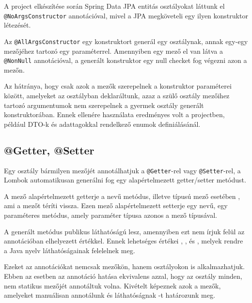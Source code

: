 A project elkészítése során Spring Data JPA entitás osztályokat láttunk el \lstinline|@NoArgsConstructor| annotációval, mivel a JPA megköveteli egy ilyen konstruktor létezését. \par


Az \lstinline|@AllArgsConstructor| egy konstruktort generál egy osztálynak, annak egy-egy mezőjéhez tartozó egy paraméterrel. Amennyiben egy mező el van látva a \lstinline|@NonNull| annotációval, a generált konstruktor egy null checket fog végezni azon a mezőn.


Az  hátránya, hogy csak azok a mezők szerepelnek a konstruktor paraméterei között, amelyeket az osztályban deklaráltunk, azaz a szülő osztály mezőihez tartozó argumentumok nem szerepelnek a gyermek osztály generált konstruktorában. Ennek ellenére használata eredményes volt a projectben, például DTO-k és adattagokkal rendelkező enumok definiálásánál.


\subsection{@Getter, @Setter}

Egy osztály bármilyen mezőjét annotálhatjuk a  \lstinline|@Getter|-rel vagy \lstinline|@Setter|-rel, a Lombok automatikusan generálni fog egy alapértelmezett getter/setter metódust. \par

A  mező alapértelmezett getterje a  nevű metódus, illetve  típusú mező esetében , ami a  mezőt téríti vissza. Ezen mező alapértelmezett setterje egy  nevű, egy paraméteres metódus, amely paraméter típusa azonos a mező típusával. \par

A generált metódus publikus láthatóságú lesz, amennyiben ezt nem írjuk felül az annotációban elhelyezett  értékkel. Ennek lehetséges értékei , ,  és , melyek rendre a Java nyelv láthatóságainak felelelnek meg. \par

Ezeket az annotációkat nemcsak mezőkön, hanem osztályokon is alkalmazhatjuk. Ebben az esetben az annotáció hatása ekvivalens azzal, hogy az osztály minden, nem statikus mezőjét annotáltuk volna. Kivételt képeznek azok a mezők, amelyeket manuálisan annotálunk és láthatóságnak -t határozunk meg. \par

